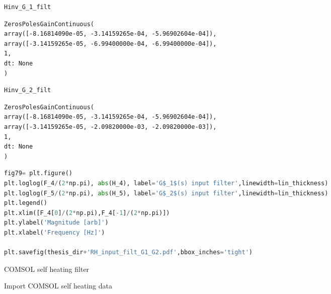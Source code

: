 \begin{spacing}{1.2} \begin{lstlisting}[frame=single,language=Python]
Hinv_G_1_filt
\end{lstlisting} \end{spacing}

\begin{spacing}{1.2} \begin{lstlisting}[frame=single]
ZerosPolesGainContinuous(
array([-8.16814090e-05, -3.14159265e-04, -5.96902604e-04]),
array([-3.14159265e-05, -6.99400000e-04, -6.99400000e-04]),
1,
dt: None
)
\end{lstlisting} \end{spacing}

\begin{spacing}{1.2} \begin{lstlisting}[frame=single,language=Python]
Hinv_G_2_filt
\end{lstlisting} \end{spacing}

\begin{spacing}{1.2} \begin{lstlisting}[frame=single]
ZerosPolesGainContinuous(
array([-8.16814090e-05, -3.14159265e-04, -5.96902604e-04]),
array([-3.14159265e-05, -2.09820000e-03, -2.09820000e-03]),
1,
dt: None
)
\end{lstlisting} \end{spacing}

\begin{spacing}{1.2} \begin{lstlisting}[frame=single,language=Python]
fig79= plt.figure()
plt.loglog(F_4/(2*np.pi), abs(H_4), label='G$_1$(s) input filter',linewidth=lin_thickness)
plt.loglog(F_5/(2*np.pi), abs(H_5), label='G$_2$(s) input filter',linewidth=lin_thickness)
plt.legend()
plt.xlim([F_4[0]/(2*np.pi),F_4[-1]/(2*np.pi)])
plt.ylabel('Magnitude [arb]')
plt.xlabel('Frequency [Hz]')

plt.savefig(thesis_dir+'RH_input_filt_G1_G2.pdf',bbox_inches='tight')
\end{lstlisting} \end{spacing}


\noindent COMSOL self heating filter

\noindent Import COMSOL self heating data

